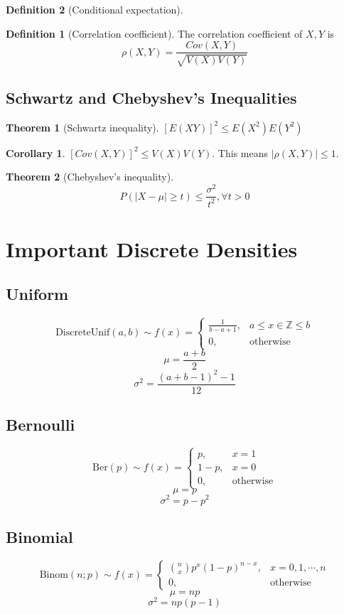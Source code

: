 \documentclass[10pt, a4paper]{extarticle}
\theoremstyle{definition}
\newtheorem{thm}{Theorem}
\newtheorem{cor}{Corollary}[thm]
\newtheorem{defn}{Definition}
\begin{document}
\begin{defn}[Conditional expectation]
	\begin{defn}[Correlation coefficient]
		The correlation coefficient of $X,Y$ is
		\[\rho(X,Y)=\frac{Cov(X,Y)}{\sqrt{V(X)V(Y)}}\]
	\end{defn}

	\subsection{Schwartz and Chebyshev's Inequalities}
	\begin{thm}[Schwartz inequality]
		$[E(XY)]^2\leq E(X^2)E(Y^2)$
	\end{thm}
	\begin{cor}
		$[Cov(X,Y)]^2\leq V(X)V(Y)$. This means $|\rho(X,Y)|\leq 1$.
	\end{cor}

	\begin{thm}[Chebyshev's inequality]
		\[P(|X-\mu|\geq t)\leq \frac{\sigma^2}{t^2}, \forall t>0\]
	\end{thm}


	\section{Important Discrete Densities}
	\subsection{Uniform}
	\[\text{DiscreteUnif}(a,b)\sim f(x)=\begin{cases}
		\frac{1}{b-a+1},&a\leq x\in\mathbb{Z}\leq b\\
		0,&\text{otherwise}
	\end{cases}\]
	\[\mu = \frac{a+b}{2}\]
	\[\sigma^2=\frac{(a+b-1)^2-1}{12}\]

	\subsection{Bernoulli}
	\[\text{Ber}(p)\sim f(x)=
	\begin{cases}
		p,&x=1\\
		1-p,&x=0\\
		0,&\text{otherwise}
	\end{cases}
	\]
	\[\mu=p\]
	\[\sigma^2=p-p^2\]

	\subsection{Binomial}
	\[\text{Binom}(n;p)\sim f(x)=\begin{cases}
		\binom{n}{x}p^x(1-p)^{n-x},&x=0,1,\cdots,n\\
		0,&\text{otherwise}
	\end{cases}\]
	\[\mu=np\]
	\[\sigma^2=np(p-1)\]


\end{defn}
\end{document}
